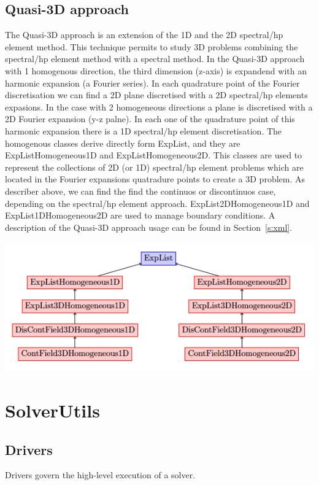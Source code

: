 \subsection{Quasi-3D approach}

The Quasi-3D approach is an extension of the 1D and the 2D spectral/hp element
method. This technique permits to study 3D problems combining the spectral/hp
element method with a spectral method. In the Quasi-3D approach with 1
homogenous direction, the third dimension (z-axis) is expandend with an harmonic
expansion (a Fourier series). In each quadrature point of the Fourier
discretisation we can find a 2D plane discretised with a 2D spectral/hp elements
expasions. In the case with 2 homogeneous directions a plane is discretised with
a 2D Fourier expansion (y-z palne). In each one of the quadrature point of this
harmonic expansion there is a 1D spectral/hp element discretisation. The
homogenous classes derive directly form ExpList, and they are
ExpListHomogeneous1D and ExpListHomogeneous2D. This classes are used to
represent the collections of 2D (or 1D) spectral/hp element problems which are
located in the Fourier expansions quatradure points to create a 3D problem. As
describer above, we can find the find the continuos or discontinuos case,
depending on the spectral/hp element approach. ExpList2DHomogeneous1D and
ExpList1DHomogeneous2D are used to manage boundary conditions. A description of
the Quasi-3D approach usage can be found in Section~\ref{s:xml}.

\begin{center}
\includegraphics[width=\textwidth]{img/Quasi3d.png}
\end{center}


\section{SolverUtils}

\subsection{Drivers}
Drivers govern the high-level execution of a solver.

